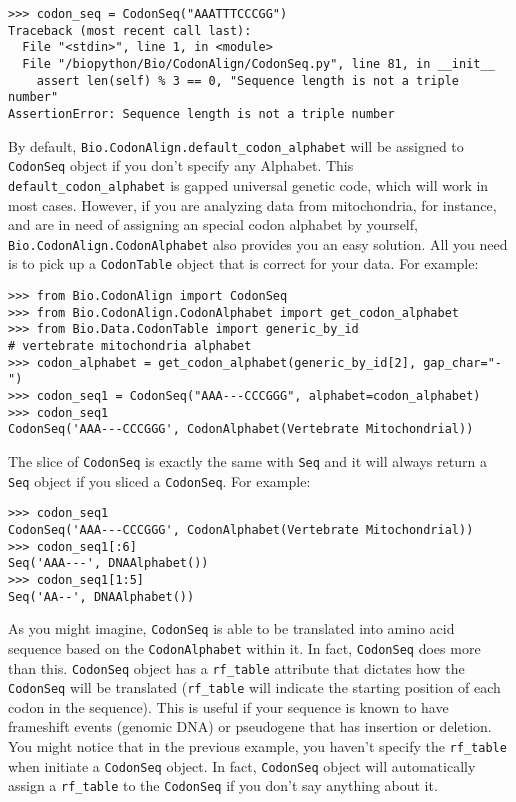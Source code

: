 \begin{verbatim}
>>> codon_seq = CodonSeq("AAATTTCCCGG")
Traceback (most recent call last):
  File "<stdin>", line 1, in <module>
  File "/biopython/Bio/CodonAlign/CodonSeq.py", line 81, in __init__
    assert len(self) % 3 == 0, "Sequence length is not a triple number"
AssertionError: Sequence length is not a triple number
\end{verbatim}

By default, \verb|Bio.CodonAlign.default_codon_alphabet| will be
assigned to \verb|CodonSeq| object if you don't specify any Alphabet.
This \verb|default_codon_alphabet| is gapped universal genetic code,
which will work in most cases. However, if you are analyzing data from
mitochondria, for instance, and are in need of assigning an special
codon alphabet by yourself, \verb|Bio.CodonAlign.CodonAlphabet| also
provides you an easy solution. All you need is to pick up a
\verb|CodonTable| object that is correct for your data. For example:

\begin{verbatim}
>>> from Bio.CodonAlign import CodonSeq
>>> from Bio.CodonAlign.CodonAlphabet import get_codon_alphabet
>>> from Bio.Data.CodonTable import generic_by_id
# vertebrate mitochondria alphabet
>>> codon_alphabet = get_codon_alphabet(generic_by_id[2], gap_char="-")
>>> codon_seq1 = CodonSeq("AAA---CCCGGG", alphabet=codon_alphabet)
>>> codon_seq1
CodonSeq('AAA---CCCGGG', CodonAlphabet(Vertebrate Mitochondrial))
\end{verbatim}

The slice of \verb|CodonSeq| is exactly the same with \verb|Seq| and
it will always return a \verb|Seq| object if you sliced a
\verb|CodonSeq|. For example:

\begin{verbatim}
>>> codon_seq1
CodonSeq('AAA---CCCGGG', CodonAlphabet(Vertebrate Mitochondrial))
>>> codon_seq1[:6]
Seq('AAA---', DNAAlphabet())
>>> codon_seq1[1:5]
Seq('AA--', DNAAlphabet())
\end{verbatim}

As you might imagine, \verb|CodonSeq| is able to be translated into
amino acid sequence based on the \verb|CodonAlphabet| within it. In
fact, \verb|CodonSeq| does more than this. \verb|CodonSeq| object
has a \texttt{rf\_table} attribute that dictates how the
\verb|CodonSeq| will be translated (\texttt{rf\_table} will indicate
the starting position of each codon in the sequence). This is useful if
your sequence is known to have frameshift events (genomic DNA) or
pseudogene that has insertion or deletion. You might notice that in the
previous example, you haven't specify the \texttt{rf\_table} when initiate
a \verb|CodonSeq| object. In fact, \verb|CodonSeq| object will
automatically assign a \texttt{rf\_table} to the \texttt{CodonSeq} if
you don't say anything about it.


